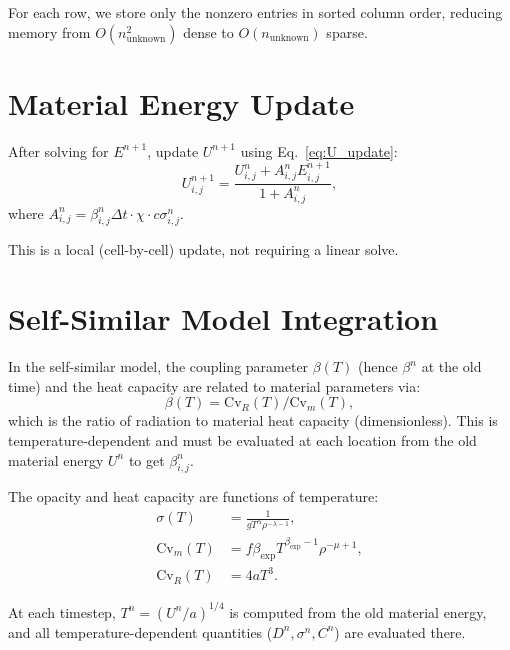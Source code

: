 \documentclass[12pt,oneside]{article}
\begin{document}
For each row, we store only the nonzero entries in sorted column order, reducing memory from $O(n_{\text{unknown}}^2)$ dense to $O(n_{\text{unknown}})$ sparse.

\section{Material Energy Update}

After solving for $E^{n+1}$, update $U^{n+1}$ using Eq.~\eqref{eq:U_update}:
\begin{equation}
U^{n+1}_{i,j}
=
\frac{U^n_{i,j} + A^n_{i,j} E^{n+1}_{i,j}}{1 + A^n_{i,j}},
\end{equation}
where $A^n_{i,j} = \beta^n_{i,j} \Delta t \cdot \chi \cdot c\sigma^n_{i,j}$.

This is a local (cell-by-cell) update, not requiring a linear solve.

\section{Self-Similar Model Integration}

In the self-similar model, the coupling parameter $\beta(T)$ (hence $\beta^n$ at the old time) and the heat capacity are related to material parameters via:
\begin{equation}
\beta(T) = \text{Cv}_R(T) / \text{Cv}_m(T),
\end{equation}
which is the ratio of radiation to material heat capacity (dimensionless). This is temperature-dependent and must be evaluated at each location from the old material energy $U^n$ to get $\beta^n_{i,j}$.

The opacity and heat capacity are functions of temperature:
\begin{align}
\sigma(T) &= \frac{1}{g T^\alpha \rho^{-\lambda - 1}},\\
\text{Cv}_m(T) &= f \beta_{\exp} T^{\beta_{\exp} - 1} \rho^{-\mu + 1},\\
\text{Cv}_R(T) &= 4 a T^3.
\end{align}

At each timestep, $T^n = (U^n / a)^{1/4}$ is computed from the old material energy, and all temperature-dependent quantities ($D^n, \sigma^n, C^n$) are evaluated there.
\end{document}

